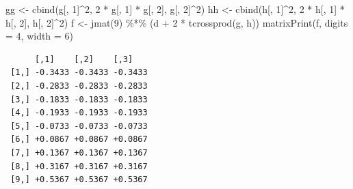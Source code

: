 \documentclass[
  12pt,
  letterpaper,
  DIV=11,
  numbers=noendperiod]{scrartcl}
\newenvironment{Shaded}{\begin{snugshade}}{\end{snugshade}}
\newcommand{\AttributeTok}[1]{\textcolor[rgb]{0.40,0.45,0.13}{#1}}
\newcommand{\DecValTok}[1]{\textcolor[rgb]{0.68,0.00,0.00}{#1}}
\newcommand{\FunctionTok}[1]{\textcolor[rgb]{0.28,0.35,0.67}{#1}}
\newcommand{\NormalTok}[1]{\textcolor[rgb]{0.00,0.23,0.31}{#1}}
\newcommand{\OtherTok}[1]{\textcolor[rgb]{0.00,0.23,0.31}{#1}}
\newcommand{\SpecialCharTok}[1]{\textcolor[rgb]{0.37,0.37,0.37}{#1}}
\begin{document}
\begin{Shaded}
\begin{Highlighting}[]
\NormalTok{gg }\OtherTok{\textless{}{-}} \FunctionTok{cbind}\NormalTok{(g[, }\DecValTok{1}\NormalTok{]}\SpecialCharTok{\^{}}\DecValTok{2}\NormalTok{, }\DecValTok{2} \SpecialCharTok{*}\NormalTok{ g[, }\DecValTok{1}\NormalTok{] }\SpecialCharTok{*}\NormalTok{ g[, }\DecValTok{2}\NormalTok{], g[, }\DecValTok{2}\NormalTok{]}\SpecialCharTok{\^{}}\DecValTok{2}\NormalTok{)}
\NormalTok{hh }\OtherTok{\textless{}{-}} \FunctionTok{cbind}\NormalTok{(h[, }\DecValTok{1}\NormalTok{]}\SpecialCharTok{\^{}}\DecValTok{2}\NormalTok{, }\DecValTok{2} \SpecialCharTok{*}\NormalTok{ h[, }\DecValTok{1}\NormalTok{] }\SpecialCharTok{*}\NormalTok{ h[, }\DecValTok{2}\NormalTok{], h[, }\DecValTok{2}\NormalTok{]}\SpecialCharTok{\^{}}\DecValTok{2}\NormalTok{)}
\NormalTok{f }\OtherTok{\textless{}{-}} \FunctionTok{jmat}\NormalTok{(}\DecValTok{9}\NormalTok{) }\SpecialCharTok{\%*\%}\NormalTok{ (d }\SpecialCharTok{+} \DecValTok{2} \SpecialCharTok{*} \FunctionTok{tcrossprod}\NormalTok{(g, h))}
\FunctionTok{matrixPrint}\NormalTok{(f, }\AttributeTok{digits =} \DecValTok{4}\NormalTok{, }\AttributeTok{width =} \DecValTok{6}\NormalTok{)}
\end{Highlighting}
\end{Shaded}

\begin{verbatim}
      [,1]    [,2]    [,3]   
 [1,] -0.3433 -0.3433 -0.3433
 [2,] -0.2833 -0.2833 -0.2833
 [3,] -0.1833 -0.1833 -0.1833
 [4,] -0.1933 -0.1933 -0.1933
 [5,] -0.0733 -0.0733 -0.0733
 [6,] +0.0867 +0.0867 +0.0867
 [7,] +0.1367 +0.1367 +0.1367
 [8,] +0.3167 +0.3167 +0.3167
 [9,] +0.5367 +0.5367 +0.5367
\end{verbatim}
\end{document}
